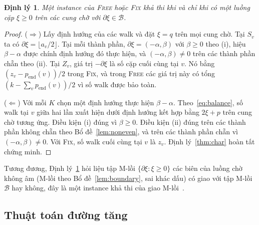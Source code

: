 \documentclass[pdflatex,sn-mathphys-num]{sn-jnl}
\theoremstyle{thmstyleone}
\newtheorem{theorem}{Định lý}
\theoremstyle{thmstyletwo}
\theoremstyle{thmstylethree}
\newcommand{\cB}{\mathcal{B}}
\newcommand{\FIX}{\textup{\textsc{Fix}}}
\newcommand{\FREE}{\textup{\textsc{Free}}}
\newcommand{\floor}[1]{\lfloor #1\rfloor}
\begin{document}
\begin{theorem}\label{thm:reduction}
Một instance của \FREE{} hoặc \FIX{} khả thi khi và chỉ khi có một luồng cặp $\xi\ge0$ trên các cung chờ với $\partial\xi\in\cB$.
\end{theorem}

\begin{proof}
($\Rightarrow$) Lấy định hướng của các walk và đặt $\xi=q$ trên mọi cung chờ. Tại $S_v$ ta có $\partial\xi=\floor{a_v/2}$. Tại mỗi thành phần, $\partial\xi=(-\alpha,\beta)$ với $\beta\ge0$ theo (i), hiệu $\beta-\alpha$ được chính định hướng đó thực hiện, và $(-\alpha,\beta)\ne0$ trên các thành phần chẵn theo (ii). Tại $Z_v$, giá trị $-\partial\xi$ là số cặp cuối cùng tại $v$. Nó bằng $(z_v-p_{\mathrm{end}}(v))/2$ trong \FIX{}, và trong \FREE{} các giá trị này có tổng $(k-\sum_vp_{\mathrm{end}}(v))/2$ vì số walk được bảo toàn.

($\Leftarrow$) Với mỗi $K$ chọn một định hướng thực hiện $\beta-\alpha$. Theo~\eqref{eq:balance}, số walk tại $v$ giữa hai lần xuất hiện dưới định hướng kết hợp bằng $2\xi+p$ trên cung chờ tương ứng. Điều kiện (i) đúng vì $\beta\ge0$. Điều kiện (ii) đúng trên các thành phần không chẵn theo Bổ đề~\ref{lem:noneven}, và trên các thành phần chẵn vì $(-\alpha,\beta)\ne0$. Với \FIX{}, số walk cuối cùng tại $v$ là $z_v$. Định lý~\ref{thm:char} hoàn tất chứng minh.
\end{proof}

Tương đương, Định lý~\ref{thm:reduction} hỏi liệu tập M-lồi $\{\partial\xi:\xi\ge0\}$ các biên của luồng chờ không âm (M-lồi theo Bổ đề~\ref{lem:boundary}, sai khác dấu) có giao với tập M-lồi $\cB$ hay không, đây là một instance khả thi của giao M-lồi~\cite{murota2003,edmonds1977,franktardos1988}.

\subsection{Thuật toán đường tăng}\label{sec:auxgraph}
\end{document}

